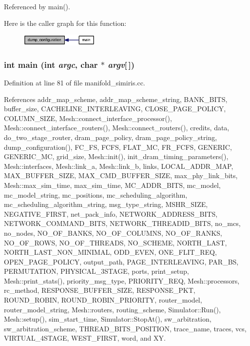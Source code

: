 Referenced by main().

Here is the caller graph for this function:\nopagebreak
\begin{figure}[H]
\begin{center}
\leavevmode
\includegraphics[width=110pt]{manifold__simiris_8cc_ba4b9ebf0f24b6a5bd293a6b7c6a54dc_icgraph}
\end{center}
\end{figure}
\subsubsection[{main}]{\setlength{\rightskip}{0pt plus 5cm}int main (int {\em argc}, \/  char $\ast$ {\em argv}[$\,$])}\label{manifold__simiris_8cc_0ddf1224851353fc92bfbff6f499fa97}




Definition at line 81 of file manifold\_\-simiris.cc.

References addr\_\-map\_\-scheme, addr\_\-map\_\-scheme\_\-string, BANK\_\-BITS, buffer\_\-size, CACHELINE\_\-INTERLEAVING, CLOSE\_\-PAGE\_\-POLICY, COLUMN\_\-SIZE, Mesh::connect\_\-interface\_\-processor(), Mesh::connect\_\-interface\_\-routers(), Mesh::connect\_\-routers(), credits, data, do\_\-two\_\-stage\_\-router, dram\_\-page\_\-policy, dram\_\-page\_\-policy\_\-string, dump\_\-configuration(), FC\_\-FS, FCFS, FLAT\_\-MC, FR\_\-FCFS, GENERIC, GENERIC\_\-MC, grid\_\-size, Mesh::init(), init\_\-dram\_\-timing\_\-parameters(), Mesh::interfaces, Mesh::link\_\-a, Mesh::link\_\-b, links, LOCAL\_\-ADDR\_\-MAP, MAX\_\-BUFFER\_\-SIZE, MAX\_\-CMD\_\-BUFFER\_\-SIZE, max\_\-phy\_\-link\_\-bits, Mesh::max\_\-sim\_\-time, max\_\-sim\_\-time, MC\_\-ADDR\_\-BITS, mc\_\-model, mc\_\-model\_\-string, mc\_\-positions, mc\_\-scheduling\_\-algorithm, mc\_\-scheduling\_\-algorithm\_\-string, msg\_\-type\_\-string, MSHR\_\-SIZE, NEGATIVE\_\-FIRST, net\_\-pack\_\-info, NETWORK\_\-ADDRESS\_\-BITS, NETWORK\_\-COMMAND\_\-BITS, NETWORK\_\-THREADID\_\-BITS, no\_\-mcs, no\_\-nodes, NO\_\-OF\_\-BANKS, NO\_\-OF\_\-COLUMNS, NO\_\-OF\_\-RANKS, NO\_\-OF\_\-ROWS, NO\_\-OF\_\-THREADS, NO\_\-SCHEME, NORTH\_\-LAST, NORTH\_\-LAST\_\-NON\_\-MINIMAL, ODD\_\-EVEN, ONE\_\-FLIT\_\-REQ, OPEN\_\-PAGE\_\-POLICY, output\_\-path, PAGE\_\-INTERLEAVING, PAR\_\-BS, PERMUTATION, PHYSICAL\_\-3STAGE, ports, print\_\-setup, Mesh::print\_\-stats(), priority\_\-msg\_\-type, PRIORITY\_\-REQ, Mesh::processors, rc\_\-method, RESPONSE\_\-BUFFER\_\-SIZE, RESPONSE\_\-PKT, ROUND\_\-ROBIN, ROUND\_\-ROBIN\_\-PRIORITY, router\_\-model, router\_\-model\_\-string, Mesh::routers, routing\_\-scheme, Simulator::Run(), Mesh::setup(), sim\_\-start\_\-time, Simulator::StopAt(), sw\_\-arbitration, sw\_\-arbitration\_\-scheme, THREAD\_\-BITS\_\-POSITION, trace\_\-name, traces, vcs, VIRTUAL\_\-4STAGE, WEST\_\-FIRST, word, and XY.

